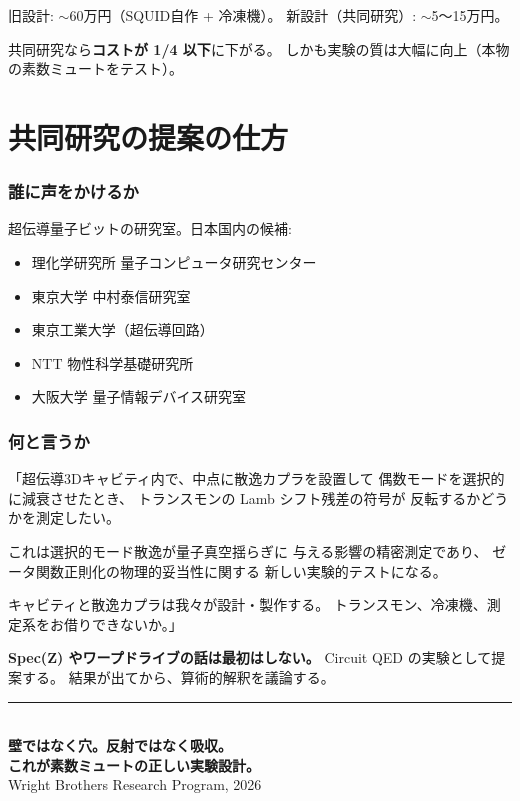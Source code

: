 \documentclass[12pt,a4paper]{article}
\begin{document}
\begin{honestbox}[旧設計との比較]
旧設計: $\sim$60万円（SQUID自作 + 冷凍機）。
新設計（共同研究）: $\sim$5〜15万円。

共同研究なら\textbf{コストが 1/4 以下}に下がる。
しかも実験の質は大幅に向上（本物の素数ミュートをテスト）。
\end{honestbox}

\part{共同研究の提案の仕方}

\section{誰に声をかけるか}

\begin{storybox}[対象]
超伝導量子ビットの研究室。日本国内の候補:
\begin{itemize}
\item 理化学研究所 量子コンピュータ研究センター
\item 東京大学 中村泰信研究室
\item 東京工業大学（超伝導回路）
\item NTT 物性科学基礎研究所
\item 大阪大学 量子情報デバイス研究室
\end{itemize}
\end{storybox}

\section{何と言うか}

\begin{expbox}[提案のテンプレート]
「超伝導3Dキャビティ内で、中点に散逸カプラを設置して
偶数モードを選択的に減衰させたとき、
トランスモンの Lamb シフト残差の符号が
反転するかどうかを測定したい。

これは選択的モード散逸が量子真空揺らぎに
与える影響の精密測定であり、
ゼータ関数正則化の物理的妥当性に関する
新しい実験的テストになる。

キャビティと散逸カプラは我々が設計・製作する。
トランスモン、冷凍機、測定系をお借りできないか。」

\textbf{Spec(Z) やワープドライブの話は最初はしない。}
Circuit QED の実験として提案する。
結果が出てから、算術的解釈を議論する。
\end{expbox}

\vfill

\begin{center}
\rule{10cm}{0.4pt}\\[0.5cm]
{\Large\textbf{壁ではなく穴。反射ではなく吸収。}}\\[0.2cm]
{\Large\textbf{これが素数ミュートの正しい実験設計。}}\\[0.3cm]
{\small Wright Brothers Research Program, 2026}
\end{center}
\end{document}
